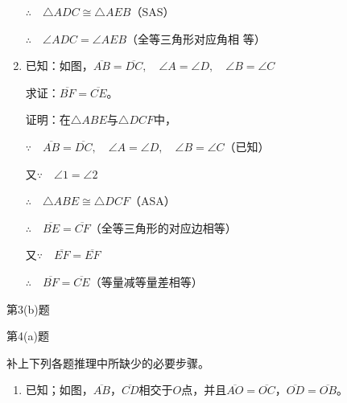 \begin{Exercise}
\begin{question}
\begin{enumerate}
$\therefore\quad \triangle ADC\cong \triangle AEB$（SAS）

$\therefore\quad \angle ADC=\angle AEB$（全等三角形对应角相
等）

\item 已知：如图，$\overline{AB}=\overline{DC},\quad \angle A=\angle D,\quad \angle B=\angle C$

求证：$\overline{BF}=\overline{CE}$。

证明：在$\triangle ABE$与$\triangle DCF$中，

$\because\quad \overline{AB}=\overline{DC},\quad \angle A=\angle D,\quad \angle B=\angle C$（已知）

又$\because\quad \angle 1=\angle 2$

$\therefore\quad \triangle ABE\cong \triangle DCF$（ASA）

$\therefore\quad \overline{BE}=\overline{CF}$（全等三角形的对应边相等）

又$\because\quad \overline{EF}=\overline{EF}$

$\therefore\quad \overline{BF}=\overline{CE}$（等量减等量差相等）
\end{enumerate}

\begin{figurehere}
    \begin{minipage}[b]{0.48\linewidth}
    \centering
\begin{tikzpicture}[>=latex, scale=1]
    \end{tikzpicture}
    \caption*{第3(b)题}
    \end{minipage}
    \begin{minipage}[b]{0.48\linewidth}
    \centering
    \begin{tikzpicture}[>=latex, scale=1]
    \end{tikzpicture}
    \caption*{第4(a)题}
    \end{minipage}
    \end{figurehere}

\item 补上下列各题推理中所缺少的必要步骤。
\begin{enumerate}
	\item 已知；如图，$\overline{AB}$，$\overline{CD}$相交于$O$点，并且$\overline{AO}=\overline{OC}$，$\overline{OD}=\overline{OB}$。


\end{enumerate}
\end{question}
\end{Exercise}
